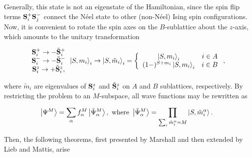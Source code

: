 \documentclass{homework}
\begin{document}
Generally, this state is not an eigenstate of the Hamiltonian, since the spin flip terms ${\bf S}_i^+ {\bf S}_j^-$ connect the Néel state to other (non-Néel) Ising spin configurations. Now, it is convenient to rotate the spin axes on the $B$-sublattice about the $z$-axis, which amounts to the unitary transformation 

\begin{equation}\begin{array}{c}
     {\bf S}_i^+ \rightarrow - \tilde{{\bf S}}_i^+ \\
     {\bf S}_i^- \rightarrow - \tilde{{\bf S}}_i^- \\
     {\bf S}_i^z \rightarrow + \tilde{{\bf S}}_i^z, 
\end{array}
    \ket{S, m_i}_i \rightarrow \ket{S, \tilde{m}_i}_i = \left\{\begin{array}{cc}
        \ket{S, m_i}_i & i \in A \\
        (1-)^{S+m_i} \ket{S, m_i}_i & i \in B 
    \end{array} \right., 
    \label{HH_su2_rotation}
\end{equation}

where $\tilde{m}_i$ are eigenvalues of ${\bf S}_i^z$ and $\tilde{{\bf S}}_i^z$ on $A$ and $B$ sublattices, respectively. By restricting the problem to an $M$-subspace, all wave functions may be rewritten as 

\begin{equation}
    \ket{\Psi^M} = \sum_{\alpha} f_{\alpha}^M \ket{\tilde{\Psi}^M_{\alpha}}, \textnormal{ where } \ket{\tilde{\Psi}^M_{\alpha}} = \prod_{\sum_{i} \tilde{m}_i^\alpha = M} \ket{S, \tilde{m}_i^\alpha}. 
\end{equation}

Then, the following theorems, first presented by Marshall and then extended by Lieb and Mattis, arise \\

\clearpage

\end{document}
